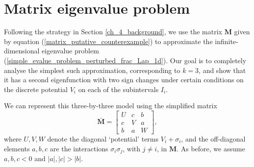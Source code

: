 \documentclass[preprint,12pt]{elsarticle}
\newcommand{\M}{\mathbf{M}}
\begin{document}
%
\section{Matrix eigenvalue problem}\label{putative_counterexample}
Following the strategy in Section \ref{ch_4_background}, we use the matrix $\M$ given by equation (\ref{matrix_putative_counterexample}) to approximate the infinite-dimensional eigenvalue problem (\ref{simple_evalue_problem_perturbed_frac_Lap_1d}). Our goal is to completely analyse the simplest such approximation, corresponding to $k=3$, and show that it has a second eigenfunction with two sign changes under certain conditions on the discrete potential $V_i$ on each of the subintervals $I_i$.

We can represent this three-by-three model using the simplified matrix
\begin{equation}\label{matrix_three-by-three}
    \bar{\M}=\begin{bmatrix}
    U & c & b\\
    c & V & a\\
    b & a & W
    \end{bmatrix},
\end{equation}
where $U, V, W$ denote the diagonal `potential' terms $V_i+\sigma_i$, and the off-diagonal elements $a,b,c$ are the interactions $\sigma_i\sigma_j$, with $j\neq i$, in $\M$. As before, we assume $a,b,c<0$ and $|a|, |c|>|b|$. 
\end{document}
